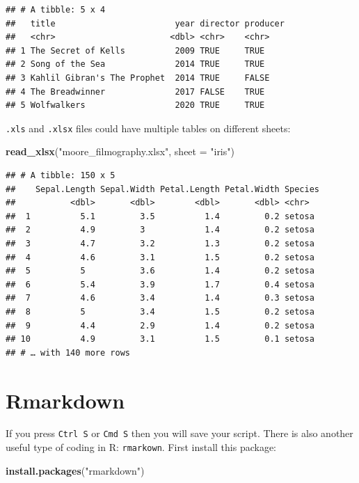 \documentclass[
]{book}
\newenvironment{Shaded}{\begin{snugshade}}{\end{snugshade}}
\newcommand{\DataTypeTok}[1]{\textcolor[rgb]{0.13,0.29,0.53}{#1}}
\newcommand{\KeywordTok}[1]{\textcolor[rgb]{0.13,0.29,0.53}{\textbf{#1}}}
\newcommand{\NormalTok}[1]{#1}
\newcommand{\StringTok}[1]{\textcolor[rgb]{0.31,0.60,0.02}{#1}}
\begin{document}
\begin{verbatim}
## # A tibble: 5 x 4
##   title                        year director producer
##   <chr>                       <dbl> <chr>    <chr>   
## 1 The Secret of Kells          2009 TRUE     TRUE    
## 2 Song of the Sea              2014 TRUE     TRUE    
## 3 Kahlil Gibran's The Prophet  2014 TRUE     FALSE   
## 4 The Breadwinner              2017 FALSE    TRUE    
## 5 Wolfwalkers                  2020 TRUE     TRUE
\end{verbatim}

\texttt{.xls} and \texttt{.xlsx} files could have multiple tables on different sheets:

\begin{Shaded}
\begin{Highlighting}[]
\KeywordTok{read_xlsx}\NormalTok{(}\StringTok{"moore_filmography.xlsx"}\NormalTok{, }\DataTypeTok{sheet =} \StringTok{"iris"}\NormalTok{)}
\end{Highlighting}
\end{Shaded}

\begin{verbatim}
## # A tibble: 150 x 5
##    Sepal.Length Sepal.Width Petal.Length Petal.Width Species
##           <dbl>       <dbl>        <dbl>       <dbl> <chr>  
##  1          5.1         3.5          1.4         0.2 setosa 
##  2          4.9         3            1.4         0.2 setosa 
##  3          4.7         3.2          1.3         0.2 setosa 
##  4          4.6         3.1          1.5         0.2 setosa 
##  5          5           3.6          1.4         0.2 setosa 
##  6          5.4         3.9          1.7         0.4 setosa 
##  7          4.6         3.4          1.4         0.3 setosa 
##  8          5           3.4          1.5         0.2 setosa 
##  9          4.4         2.9          1.4         0.2 setosa 
## 10          4.9         3.1          1.5         0.1 setosa 
## # … with 140 more rows
\end{verbatim}

\hypertarget{rmarkdown}{%
\section{Rmarkdown}\label{rmarkdown}}

If you press \texttt{Ctrl\ S} or \texttt{Cmd\ S} then you will save your script. There is also another useful type of coding in R: \texttt{rmarkown}. First install this package:

\begin{Shaded}
\begin{Highlighting}[]
\KeywordTok{install.packages}\NormalTok{(}\StringTok{"rmarkdown"}\NormalTok{)}
\end{Highlighting}
\end{Shaded}
\end{document}
